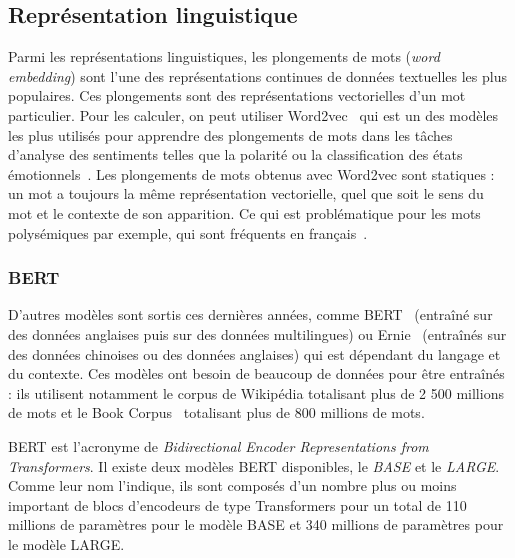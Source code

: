 \subsection{Représentation linguistique}
Parmi les représentations linguistiques, les plongements de mots (\textit{word embedding}) sont l'une des représentations continues de données textuelles les plus populaires. Ces plongements sont des représentations vectorielles d'un mot particulier. Pour les calculer, on peut utiliser Word2vec~\cite{word2vec} qui est un des modèles les plus utilisés pour apprendre des plongements de mots dans les tâches d'analyse des sentiments telles que la polarité ou la classification des états émotionnels~\cite{Rodrigo2020,Dong2018}. Les plongements de mots obtenus avec Word2vec sont statiques : un mot a toujours la même représentation vectorielle, quel que soit le sens du mot et le contexte de son apparition. Ce qui est problématique pour les mots polysémiques par exemple, qui sont fréquents en français~\cite{Pustejovsky1996}.

\subsubsection{BERT}
D'autres modèles sont sortis ces dernières années, comme BERT~\cite{Devlin2019} (entraîné sur des données anglaises puis sur des données multilingues) ou Ernie~\cite{Zhang2019Ernie} (entraînés sur des données chinoises ou des données anglaises) qui est dépendant du langage et du contexte. Ces modèles ont besoin de beaucoup de données pour être entraînés : ils utilisent notamment le corpus de Wikipédia totalisant plus de 2 500 millions de mots et le Book Corpus~\cite{Zhu2015} totalisant plus de 800 millions de mots.

BERT est l’acronyme de \textit{Bidirectional Encoder Representations from Transformers}. Il existe deux modèles BERT disponibles, le \textit{BASE} et le \textit{LARGE}. Comme leur nom l'indique, ils sont composés d'un nombre plus ou moins important de blocs d'encodeurs de type Transformers pour un total de 110 millions de paramètres pour le modèle BASE et 340 millions de paramètres pour le modèle LARGE.

